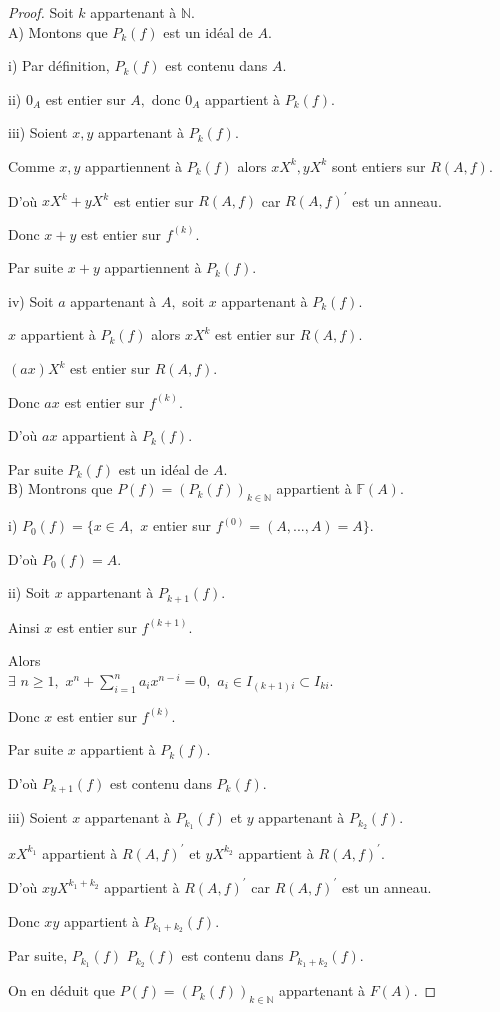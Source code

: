 \begin{proof}
	Soit $k$ appartenant à $ \mathbb{N}.$ \\
	A) Montons que $P_{k}(f)$ est un idéal de $A$.
	
	i) Par définition, $P_{k}(f)$ est contenu dans $ A.$
	
	ii) $0_{A}$ est entier sur $A,$ donc $0_{A}$ appartient à $ P_{k}(f)$.
	
	iii) Soient $x,y$ appartenant à $ P_{k}(f).$
	
	Comme $x,y$ appartiennent à $ P_{k}(f)$ alors $xX^{k},yX^{k}$ sont entiers sur $R(A,f)$.
	
	D'où $xX^{k}+yX^{k}$ est entier sur $R(A,f)$ car $R(A,f)^{\prime }$ est
	un anneau.
	
	Donc $x+y$ est entier sur $f^{(k)}$.
	
	Par suite $x+y$ appartiennent à $ P_{k}(f).$
	
	iv) Soit $a$ appartenant à $ A,$ soit $x$ appartenant à $ P_{k}(f).$
	
	$x$ appartient à $ P_{k}(f)$ alors $xX^{k}$ est entier sur $R(A,f).$
	
	$(ax)X^{k}$ est entier sur $R(A,f)$.
	
	Donc $ax$ est entier sur $f^{(k)}$.
	
	D'où $ax$ appartient à $ P_{k}(f)$.
	
	Par suite $P_{k}(f)$ est un idéal de $A.$ \\
	B) Montrons que $P(f)=(P_{k}(f))_{k\in \mathbb{N}}$ appartient à $ \mathbb{F}(A)$.
	
	i) $P_{0}(f)=\{x\in A,$ $x$ entier sur $f^{(0)}=(A,...,A)=A\}$.
	
	D'où $P_{0}(f)=A$.
	
	ii) Soit $x$ appartenant à $ P_{k+1}(f).$
	
	Ainsi $x$ est entier sur $f^{(k+1)}.$
	
	Alors \\ $\exists$  $n\geq 1,$ $x^{n}+\sum\limits_{i=1}^{n}a_{i}x^{n-i}=0,$ $
	a_{i}\in I_{(k+1)i}\subset I_{ki}$.
	
	Donc $x$ est entier sur $f^{(k)}$.
	
	Par suite $x$ appartient à $ P_{k}(f).$
	
	D'où $P_{k+1}(f)$ est contenu dans $ P_{k}(f).$
	
	iii) Soient $x$ appartenant à $ P_{k_{1}}(f)$ et $y$ appartenant à $ P_{k_{2}}(f)$.
	
	$xX^{k_{1}}$ appartient à $ R(A,f)^{\prime }$ et $yX^{k_{2}}$ appartient à $ R(A,f)^{\prime }.$
	
	D'où $xyX^{k_{1}+k_{2}}$ appartient à $ R(A,f)^{\prime }$ car $R(A,f)^{\prime }$ est un anneau.
	
	Donc $xy$ appartient à $ P_{k_{1}+k_{2}}(f)$.
	
	Par suite, $P_{k_{1}}(f)$ $P_{k_{2}}(f)$ est contenu dans $ P_{k_{1}+k_{2}}(f).$
	
	On en déduit que $P(f)=(P_{k}(f))_{k\in \mathbb{N}}$ appartenant à $ F(A).$
\end{proof}
